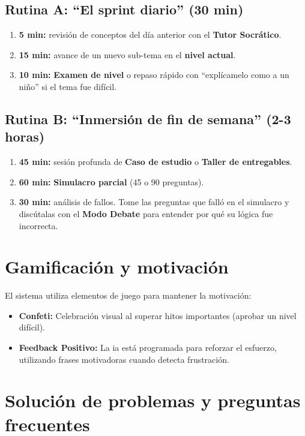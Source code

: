 \subsection{Rutina A: \enquote{El sprint diario} (30 min)}
\begin{enumerate}
\item \textbf{5 min:} revisión de conceptos del día anterior con el \textbf{Tutor Socrático}.
\item \textbf{15 min:} avance de un nuevo sub-tema en el \textbf{nivel actual}.
\item \textbf{10 min:} \textbf{Examen de nivel} o repaso rápido con \enquote{explícamelo como a un niño} si el tema fue difícil.
\end{enumerate}
\subsection{Rutina B: \enquote{Inmersión de fin de semana} (2-3 horas)}
\begin{enumerate}
\item \textbf{45 min:} sesión profunda de \textbf{Caso de estudio} o \textbf{Taller de entregables}.
\item \textbf{60 min:} \textbf{Simulacro parcial} (45 o 90 preguntas).
\item \textbf{30 min:} análisis de fallos. Tome las preguntas que falló en el simulacro y discútalas con el \textbf{Modo Debate} para entender por qué su lógica fue incorrecta.
\end{enumerate}
\section{Gamificación y motivación}

El sistema utiliza elementos de juego para mantener la motivación:
\begin{itemize}
\item \textbf{Confeti:} Celebración visual al superar hitos importantes (aprobar un nivel difícil).
\item \textbf{Feedback Positivo:} La \gls{ia} está programada para reforzar el esfuerzo, utilizando frases motivadoras cuando detecta frustración.
\end{itemize}
\section{Solución de problemas y preguntas frecuentes}

